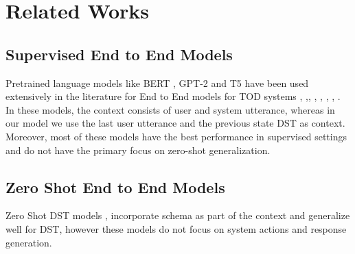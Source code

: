 \section{Related Works}

\subsection{Supervised End to End Models}
Pretrained language models like BERT \citep{Devlin2019BERTPO}, GPT-2 \citep{Radford2019LanguageMA} and T5 \citep{Raffel2019ExploringTL}
have been used extensively in the literature for End to End models for TOD systems \citep{HosseiniAsl2020ASL},
\citep{Peng2021SoloistBT},\citep{Lee2020SUMBTLaRLEN}, \citep{Yang2020UBARTF}, \citep{Jeon2021DORATP}, \citep{Sun2022BORTBA}, \citep{Yang2022UBARv2TM}, \citep{Noroozi2020AFA}.
In these models, the context consists of user and system utterance, whereas in our model we use the last user utterance and the previous state DST as context.
Moreover, most of these models have the best performance in supervised settings and do not have the primary focus on zero-shot generalization.

\subsection{Zero Shot End to End Models}

Zero Shot DST models \citep{Feng2020ASA}, \citep{Zhao2022DescriptionDrivenTD} incorporate schema as part of the context and generalize
well for DST, however these models do not focus on system actions and response generation.
